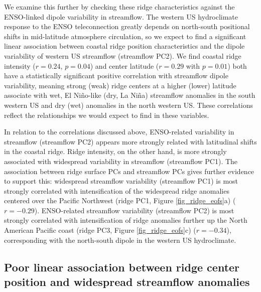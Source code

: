 \documentclass[final, double]{ua-thesis}
\begin{document}
We examine this further by checking these ridge characteristics against the ENSO-linked dipole variability in streamflow. The western US hydroclimate response to the ENSO teleconnection greatly depends on north-south positional shifts in mid-latitude atmosphere circulation, so we expect to find a significant linear association between coastal ridge position characteristics and the dipole variability of western US streamflow (streamflow PC2). We find coastal ridge intensity ($r = 0.24$, $p = 0.04$) and center latitude ($r = 0.29$ with $p = 0.01$) both have a statistically significant positive correlation with streamflow dipole variability, meaning strong (weak) ridge centers at a higher (lower) latitude associate with wet, El Ni\~{n}o-like (dry, La Ni\~{n}a) streamflow anomalies in the south western US and dry (wet) anomalies in the north western US. These correlations reflect the relationships we would expect to find in these variables.

In relation to the correlations discussed above, ENSO-related variability in streamflow (streamflow PC2) appears more strongly related with latitudinal shifts in the coastal ridge. Ridge intensity, on the other hand, is more strongly associated with widespread variability in streamflow (streamflow PC1). The association between ridge surface PCs and streamflow PCs gives further evidence to support this: widespread streamflow variability (streamflow PC1) is most strongly correlated with intensification of the widespread ridge anomalies centered over the Pacific Northwest (ridge PC1, Figure \ref{fig_ridge_eofs}a) ($r = -0.29$). ENSO-related streamflow variability (streamflow PC2) is most strongly correlated with intensification of ridge anomalies further up the North American Pacific coast (ridge PC3, Figure \ref{fig_ridge_eofs}c) ($r = -0.34$), corresponding with the north-south dipole in the western US hydroclimate.


\subsection{Poor linear association between ridge center position and widespread streamflow anomalies}
\end{document}
